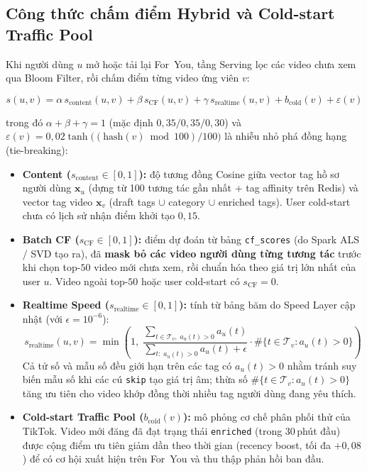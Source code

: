 \subsection{Công thức chấm điểm Hybrid và Cold-start Traffic Pool}

Khi người dùng $u$ mở hoặc tải lại For~You, tầng Serving lọc các video chưa xem qua Bloom Filter, rồi chấm điểm từng video ứng viên $v$:

\begin{equation}
  s(u,v) = \alpha\, s_{\mathrm{content}}(u,v)
          + \beta\, s_{\mathrm{CF}}(u,v)
          + \gamma\, s_{\mathrm{realtime}}(u,v)
          + b_{\mathrm{cold}}(v)
          + \varepsilon(v)
\end{equation}

trong đó $\alpha + \beta + \gamma = 1$ (mặc định $0{,}35 / 0{,}35 / 0{,}30$) và $\varepsilon(v) = 0{,}02\tanh\!\big((\mathrm{hash}(v)\bmod 100)/100\big)$ là nhiễu nhỏ phá đồng hạng (tie-breaking):

\begin{itemize}
  \item \textbf{Content ($s_{\mathrm{content}} \in [0,1]$):} độ tương đồng Cosine giữa vector tag hồ sơ người dùng $\mathbf{x}_u$ (dựng từ 100 tương tác gần nhất + tag affinity trên Redis) và vector tag video $\mathbf{x}_v$ (draft tags $\cup$ category $\cup$ enriched tags). User cold-start chưa có lịch sử nhận điểm khởi tạo $0{,}15$.
  \item \textbf{Batch CF ($s_{\mathrm{CF}} \in [0,1]$):} điểm dự đoán từ bảng \texttt{cf\_scores} (do Spark ALS / SVD tạo ra), đã \textbf{mask bỏ các video người dùng từng tương tác} trước khi chọn top-$50$ video mới chưa xem, rồi chuẩn hóa theo giá trị lớn nhất của user $u$. Video ngoài top-$50$ hoặc user cold-start có $s_{\mathrm{CF}} = 0$.
  \item \textbf{Realtime Speed ($s_{\mathrm{realtime}} \in [0,1]$):} tính từ bảng băm  do Speed Layer cập nhật (với $\epsilon = 10^{-6}$):
  \begin{equation}
    s_{\mathrm{realtime}}(u,v)
    = \min\!\left(
        1,\;
        \frac{\sum_{t\in\mathcal{T}_v,\; a_u(t)>0} a_u(t)}
             {\sum_{t:\; a_u(t)>0} a_u(t)+\epsilon}
        \cdot \#\{t\in\mathcal{T}_v: a_u(t)>0\}
      \right)
  \end{equation}
  Cả tử số và mẫu số đều giới hạn trên các tag có $a_u(t) > 0$ nhằm tránh suy biến mẫu số khi các cú \texttt{skip} tạo giá trị âm; thừa số $\#\{t\in\mathcal{T}_v: a_u(t)>0\}$ tăng ưu tiên cho video khớp đồng thời nhiều tag người dùng đang yêu thích.
  \item \textbf{Cold-start Traffic Pool ($b_{\mathrm{cold}}(v)$):} mô phỏng cơ chế phân phối thử của TikTok. Video mới đăng đã đạt trạng thái \texttt{enriched} (trong 30\,phút đầu) được cộng điểm ưu tiên giảm dần theo thời gian (recency boost, tối đa $+0{,}08$) để có cơ hội xuất hiện trên For~You và thu thập phản hồi ban đầu.
\end{itemize}

